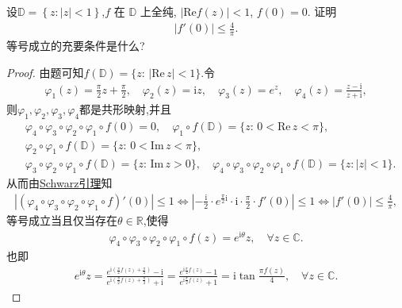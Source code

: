 \documentclass[../../main.tex]{subfiles}%
\begin{document}
\begin{example}
设$\mathbb{D} =\left\{ z:\left| z \right|<1 \right\}$,$f$ 在 $\mathbb{D}$ 上全纯, $|\mathrm{Re}f(z)| < 1$, $f(0)=0$. 证明
\begin{align*}
|f'(0)| \leqslant \frac{4}{\pi}.
\end{align*}
等号成立的充要条件是什么?
\end{example}
\begin{proof}
由题可知$f(\mathbb{D})=\{z:\,|\mathrm{Re}\,z|<1\}$.令
\begin{align*}
\varphi_1(z)=\frac{\pi}{2}z+\frac{\pi}{2},\quad \varphi_2(z)=\mathrm{i}z,\quad \varphi_3(z)=e^z,\quad \varphi_4(z)=\frac{z-\mathrm{i}}{z+\mathrm{i}},
\end{align*}
则$\varphi_1,\varphi_2,\varphi_3,\varphi_4$都是共形映射,并且
\begin{align*}
&\varphi_4\circ \varphi_3\circ \varphi_2\circ \varphi_1\circ f(0)=0,\quad \varphi_1\circ f(\mathbb{D})=\{z:\,0<\mathrm{Re}\,z<\pi\},\\
&\varphi_2\circ \varphi_1\circ f(\mathbb{D})=\{z:\,0<\mathrm{Im}\,z<\pi\},\\
&\varphi_3\circ \varphi_2\circ \varphi_1\circ f(\mathbb{D})=\{z:\,\mathrm{Im}\,z>0\},\quad \varphi_4\circ \varphi_3\circ \varphi_2\circ \varphi_1\circ f(\mathbb{D})=\{z:|z|<1\}.
\end{align*}
从而由\hyperref[theorem:Schwarz引理-定理4.5.3]{Schwarz引理}知
\begin{align*}
\left|\left(\varphi_4\circ \varphi_3\circ \varphi_2\circ \varphi_1\circ f\right)'(0)\right|\leqslant 1\Longleftrightarrow \left|-\frac{\mathrm{i}}{2}\cdot e^{\frac{\pi}{2}\mathrm{i}}\cdot \mathrm{i}\cdot \frac{\pi}{2}\cdot f'(0)\right|\leqslant 1\Longleftrightarrow |f'(0)|\leqslant \frac{4}{\pi},
\end{align*}
等号成立当且仅当存在$\theta\in\mathbb{R}$,使得
\begin{align*}
\varphi_4\circ \varphi_3\circ \varphi_2\circ \varphi_1\circ f(z)=e^{\mathrm{i}\theta}z,\quad \forall z\in\mathbb{C}.
\end{align*}
也即
\begin{align*}
e^{\mathrm{i}\theta}z=\frac{e^{\mathrm{i}\left(\frac{\pi}{2}f(z)+\frac{\pi}{2}\right)}-\mathrm{i}}{e^{\mathrm{i}\left(\frac{\pi}{2}f(z)+\frac{\pi}{2}\right)}+\mathrm{i}}=\frac{e^{\mathrm{i}\frac{\pi}{2}f(z)}-1}{e^{\mathrm{i}\frac{\pi}{2}f(z)}+1}=\mathrm{i}\tan\frac{\pi f(z)}{4},\quad \forall z\in\mathbb{C}.
\end{align*}
\end{proof}
\end{document}
